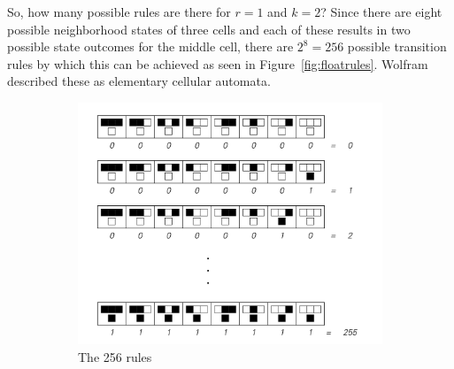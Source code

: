 \documentclass[9pt,a4paper,twoside]{tau-class/tau}
\begin{document}
    So, how many possible rules are there for \( r = 1 \) and \( k = 2 \)? Since there are eight possible neighborhood states of three cells and each of these results in two possible state outcomes for the middle cell, there are \( 2^8 = 256 \) possible transition rules by which this can be achieved as seen in Figure~\ref{fig:floatrules}. Wolfram described these as elementary cellular automata.

    \begin{figure}[tp] %
		\centering
		  \begin{subfigure}[b]{0.38\linewidth} %
			\includegraphics[width=\linewidth]{figures/rules256.png}
			\caption{The 256 rules}
		\end{subfigure}
			\hspace{20pt}   %
		\begin{subfigure}[b]{0.375\linewidth} %

\end{subfigure}
\end{figure}
\end{document}
